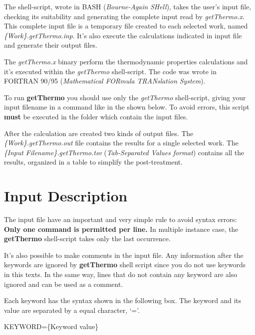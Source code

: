 \documentclass[11pt,oneside,a4paper]{article}
\begin{document}
The shell-script, wrote in BASH (\textit{Bourne-Again SHell}), takes the user's input file, checking its suitability and generating the complete input read by \textit{getThermo.x}. This complete input file is a temporary file created to each selected work, named \textit{\{Work\}.getThermo.inp}. It's also execute the calculations indicated in input file and generate their output files.

The \textit{getThermo.x} binary perform the thermodynamic properties calculations and it's executed within the \textit{getThermo} shell-script. The code was wrote in FORTRAN 90/95 (\textit{Mathematical FORmula TRANslation System}).

To run \textbf{getThermo} you should use only the \textit{getThermo} shell-script, giving your input filename in a command like in the shown below. To avoid errors, this script \textbf{must} be executed in the folder which contain the input files.

After the calculation are created two kinds of output files. The \textit{\{Work\}.getThermo.out} file contains the results for a single selected work. The \textit{\{Input Filename\}.getThermo.tsv} (\textit{Tab-Separated Values format}) contains all the results, organized in a table to simplify the post-treatment. 

\pagebreak
\section[Input Description]{Input Description}

The input file have an important and very simple rule to avoid syntax errors: \textbf{Only one command is permitted per line.} In multiple instance case, the \textbf{getThermo} shell-script takes only the last occurrence.

It's also possible to make comments in the input file. Any information after the keywords are ignored by \textbf{getThermo} shell script since you do not use keywords in this texts. In the same way, lines that do not contain any keyword are also ignored and can be used as a comment.

Each keyword has the syntax shown in the following box. The keyword and its value are separated by a equal character, `='.
\begin{shaded}
KEYWORD=\{Keyword value\}
\end{shaded}
\end{document}
